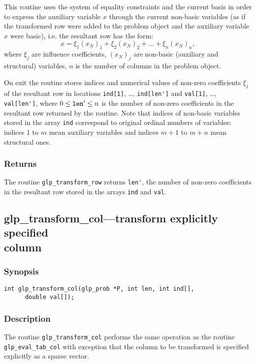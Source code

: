 This routine uses the system of equality constraints and the current
basis in order to express the auxiliary variable $x$ through the current
non-basic variables (as if the transformed row were added to the problem
object and the auxiliary variable $x$ were basic), i.e. the resultant
row has the form:
$$x=\xi_1(x_N)_1+\xi_2(x_N)_2+\dots+\xi_n(x_N)_n,$$
where $\xi_j$ are influence coefficients, $(x_N)_j$ are non-basic
(auxiliary and structural) variables, $n$ is the number of columns in
the problem object.

On exit the routine stores indices and numerical values of non-zero
coefficients $\xi_j$ of the resultant row in locations \verb|ind[1]|,
\dots, \verb|ind[len']| and \verb|val[1]|, \dots, \verb|val[len']|,
where $0\leq{\tt len'}\leq n$ is the number of non-zero coefficients in
the resultant row returned by the routine. Note that indices of
non-basic variables stored in the array \verb|ind| correspond to
original ordinal numbers of variables: indices 1 to $m$ mean auxiliary
variables and indices $m+1$ to $m+n$ mean structural ones.

\subsubsection*{Returns}

The routine \verb|glp_transform_row| returns \verb|len'|, the number of
non-zero coefficients in the resultant row stored in the arrays
\verb|ind| and \verb|val|.

\subsection{glp\_transform\_col---transform explicitly specified\\
column}

\subsubsection*{Synopsis}

\begin{verbatim}
int glp_transform_col(glp_prob *P, int len, int ind[],
      double val[]);
\end{verbatim}

\subsubsection*{Description}

The routine \verb|glp_transform_col| performs the same operation as the
routine \verb|glp_eval_tab_col| with exception that the column to be
transformed is specified explicitly as a sparse vector.

